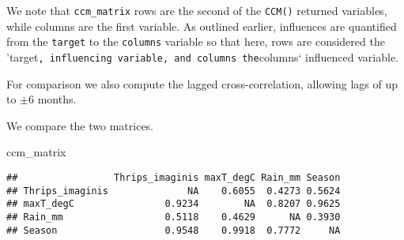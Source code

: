 \documentclass[]{article}
\newenvironment{Shaded}{\begin{snugshade}}{\end{snugshade}}
\newcommand{\ControlFlowTok}[1]{\textcolor[rgb]{0.13,0.29,0.53}{\textbf{#1}}}
\newcommand{\DataTypeTok}[1]{\textcolor[rgb]{0.13,0.29,0.53}{#1}}
\newcommand{\DecValTok}[1]{\textcolor[rgb]{0.00,0.00,0.81}{#1}}
\newcommand{\KeywordTok}[1]{\textcolor[rgb]{0.13,0.29,0.53}{\textbf{#1}}}
\newcommand{\NormalTok}[1]{#1}
\newcommand{\OperatorTok}[1]{\textcolor[rgb]{0.81,0.36,0.00}{\textbf{#1}}}
\newcommand{\OtherTok}[1]{\textcolor[rgb]{0.56,0.35,0.01}{#1}}
\newcommand{\StringTok}[1]{\textcolor[rgb]{0.31,0.60,0.02}{#1}}
\begin{document}
We note that \texttt{ccm\_matrix} rows are the second of the
\texttt{CCM()} returned variables, while columns are the first variable.
As outlined earlier, influences are quantified from the \texttt{target}
to the \texttt{columns} variable so that here, rows are considered the
'target\texttt{,\ influencing\ variable,\ and\ columns\ the}columns`
influenced variable.

For comparison we also compute the lagged cross-correlation, allowing
lags of up to \(\pm 6\) months.

\begin{Shaded}
\end{Shaded}

We compare the two matrices.

\begin{Shaded}
\begin{Highlighting}[]
\NormalTok{ccm_matrix}
\end{Highlighting}
\end{Shaded}

\begin{verbatim}
##                 Thrips_imaginis maxT_degC Rain_mm Season
## Thrips_imaginis              NA    0.6055  0.4273 0.5624
## maxT_degC                0.9234        NA  0.8207 0.9625
## Rain_mm                  0.5118    0.4629      NA 0.3930
## Season                   0.9548    0.9918  0.7772     NA
\end{verbatim}
\end{document}
